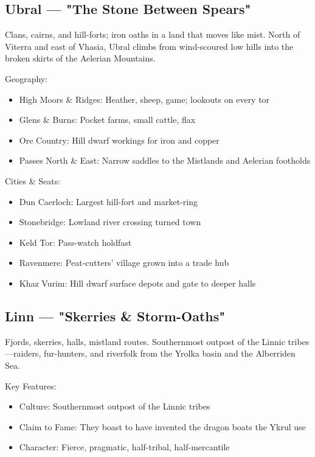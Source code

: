 \subsection{Ubral — "The Stone Between Spears"}
\label{sec:ubral}

Clans, cairns, and hill-forts; iron oaths in a land that moves like mist. North of Viterra and east of Vhasia, Ubral climbs from wind-scoured low hills into the broken skirts of the Aelerian Mountains.

Geography:
\begin{itemize}
    \item High Moors \& Ridges: Heather, sheep, game; lookouts on every tor
    \item Glens \& Burns: Pocket farms, small cattle, flax
    \item Ore Country: Hill dwarf workings for iron and copper
    \item Passes North \& East: Narrow saddles to the Mistlands and Aelerian footholds
\end{itemize}

Cities \& Seats:
\begin{itemize}
    \item Dun Caerloch: Largest hill-fort and market-ring
    \item Stonebridge: Lowland river crossing turned town
    \item Keld Tor: Pass-watch holdfast
    \item Ravenmere: Peat-cutters' village grown into a trade hub
    \item Khaz Vurim: Hill dwarf surface depots and gate to deeper halls
\end{itemize}

\subsection{Linn — "Skerries \& Storm-Oaths"}
\label{sec:linn}

Fjords, skerries, halls, mistland routes. Southernmost outpost of the Linnic tribes—raiders, fur-hunters, and riverfolk from the Yrolka basin and the Alberriden Sea.

Key Features:
\begin{itemize}
    \item Culture: Southernmost outpost of the Linnic tribes
    \item Claim to Fame: They boast to have invented the dragon boats the Ykrul use
    \item Character: Fierce, pragmatic, half-tribal, half-mercantile
\end{itemize}

